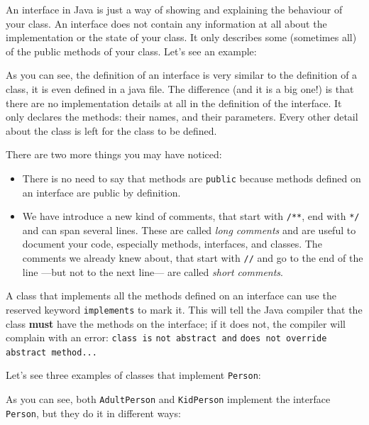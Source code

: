 An interface in Java is just a way of showing and explaining the
behaviour of your class. An interface does not contain any information
at all about the implementation or the state of your class. It only
describes some (sometimes all) of the public methods of your
class. Let's see an example: 


As you can see, the definition of an interface is very similar to the
definition of a class, it is even defined in a java file. 
The difference (and it is a big one!) is that
there are no implementation details at all in the definition of the
interface. It only declares the methods: their names, and their
parameters. Every other detail about the class is left for the class
to be defined. 

There are two more things you may have noticed: 

\begin{itemize}
\item There is no need to say that methods are \verb+public+
  because methods defined on an interface are public by definition.
\item We have introduce a new kind of comments, that start with
  \verb+/**+, end with \verb+*/+ and can span several lines. These
  are called \emph{long comments} and are useful to document your
  code, especially methods, interfaces, and classes. The comments we
  already knew about, that start with \verb+//+ and go to the end of
  the line ---but not to the next line--- are called \emph{short
    comments}. 
\end{itemize}

A class that implements all the methods defined on an interface can
use the reserved keyword \verb+implements+ to mark it. This will tell
the Java compiler that the class \textbf{must} have the methods on the
interface; if it does not, the compiler will complain with an error:
\verb+class is+ \verb+not abstract and+ \verb+does not override+
\verb+abstract method...+ 

Let's see three examples of classes that implement \verb+Person+:



As you can see, both \verb+AdultPerson+ and \verb+KidPerson+ implement
the interface \verb+Person+, but they do it in different ways: 

